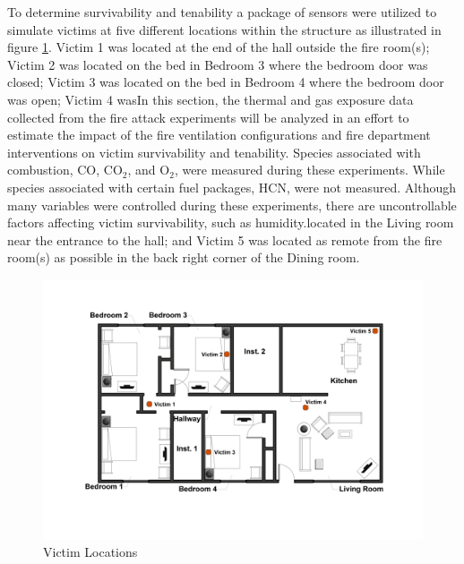 \documentclass[12pt,oneside]{book}
\begin{document}


To determine survivability and tenability a package of sensors were utilized to simulate victims at five different locations within the structure as illustrated in figure \ref{fig:vic_loc}. Victim 1 was located at the end of the hall outside the fire room(s); Victim 2 was located on the bed in Bedroom 3 where the bedroom door was closed; Victim 3 was located on the bed in Bedroom 4 where the bedroom door was open; Victim 4 wasIn this section, the thermal and gas exposure data collected from the fire attack experiments will be analyzed in an effort to estimate the impact of the fire ventilation configurations and fire department interventions on victim survivability and tenability. Species associated with combustion, CO, CO$_{2}$, and O$_{2}$, were measured during these experiments. While species associated with certain fuel packages, HCN, were not measured. Although many variables were controlled during these experiments, there are uncontrollable factors affecting victim survivability, such as humidity.located in the Living room near the entrance to the hall; and Victim 5 was located as remote from the fire room(s) as possible in the back right corner of the Dining room. 

\begin{figure}[H]
	\centering
	\includegraphics[width=\textwidth]{../0_Images/Instrumentation/Victim_Locations}
	\caption{Victim Locations}
	\label{fig:vic_loc}
\end{figure}
\end{document}

